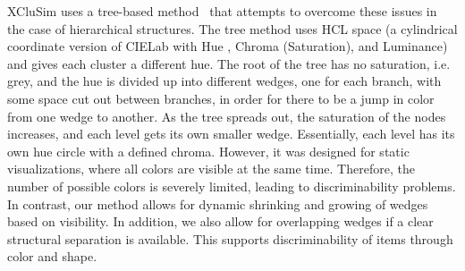 \documentclass{egpubl}
\begin{document}
	XCluSim uses a tree-based method~\cite{tennekes2014tree} that attempts to overcome these issues in the case of hierarchical structures. 
	The tree method uses HCL space (a cylindrical coordinate version of CIELab with Hue , Chroma (Saturation), and Luminance) and gives each cluster a different hue. 
	The root of the tree has no saturation, i.e. grey, and the hue is divided up into different wedges, one for each branch, with some space cut out between branches, in order for there to be a jump in color from one wedge to another. 
	As the tree spreads out, the saturation of the nodes increases, and each level gets its own smaller wedge. 
	Essentially, each level has its own hue circle with a defined chroma. 
	However, it was designed for static visualizations, where all colors are visible at the same time. Therefore, the number of possible colors is severely limited, leading to discriminability problems.
	In contrast, our method allows for dynamic shrinking and growing of wedges based on visibility. 
	In addition, we also allow for overlapping wedges if a clear structural separation is available. 
	This supports discriminability of items through color and shape. 
	
	
	
\end{document}

